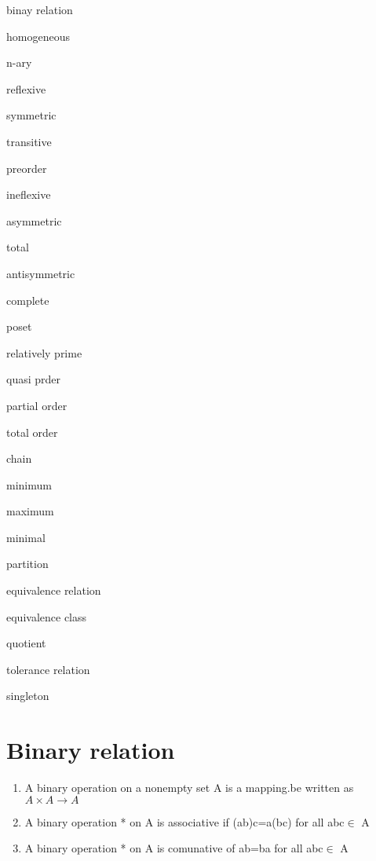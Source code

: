 \documentclass[cn,10pt,math=newtx,citestyle=gb7714-2015,bibstyle=gb7714-2015]{elegantbook}
\begin{document}
\begin{introduction}[Keywords]
    \item  binay relation 
    \item homogeneous
    \item n-ary
    \item reflexive
    \item symmetric
    \item transitive
    \item  preorder
    \item  ineflexive
    \item asymmetric
    \item total
    \item antisymmetric
    \item complete
    \item poset
    \item relatively prime
    \item quasi prder
    \item partial order
    \item total order
    \item chain 
    \item minimum
    \item maximum
    \item minimal
    \item partition
    \item equivalence relation
    \item equivalence class
    \item quotient
    \item tolerance relation
    \item singleton
\end{introduction}
\section{Binary relation}

\begin{definition}[binary]
\begin{enumerate}
	\item 	A binary operation on a nonempty set A is a mapping.be written as $A\times A\to A$
	\item A binary operation * on A is associative if (ab)c=a(bc) for all abc$\in$ A
	\item A binary operation * on A is comunative of ab=ba for all abc$\in$ A
\end{enumerate}
\end{definition}
\end{document}
